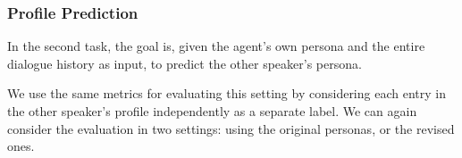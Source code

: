 \subsubsection{Profile Prediction}

In the second task, the goal is, given the agent's own persona and the entire dialogue history as input, to predict the other speaker's persona.

We use the same metrics for evaluating this setting by considering each entry in the other speaker's profile independently as a separate label. We can again consider the evaluation in two settings: using the original personas, or the revised ones. 
\fi
